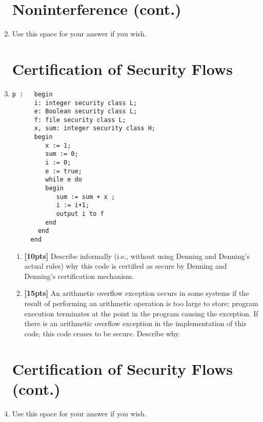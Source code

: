 \documentclass[12pt]{article}
\begin{document}
\begin{enumerate}
\newpage
\section*{Noninterference (cont.)}
\item[] Use this space for your answer if you wish.

\newpage
\section{Certification of Security Flows}
\item[]
\begin{verbatim}
p :   begin
      i: integer security class L; 
      e: Boolean security class L;
      f: file security class L;
      x, sum: integer security class H;
      begin
         x := 1;
         sum := 0; 
         i := 0;
         e := true; 
         while e do
         begin
            sum := sum + x ; 
            i := i+1;
            output i to f
         end 
       end
     end
\end{verbatim}
\begin{enumerate}
\item {\bf [10pts]} Describe informally (i.e., without using Denning and Denning's actual rules) why this code is certified as secure by Denning and Denning's certification mechanism. 
\item {\bf [15pts]} An arithmetic overflow exception occurs in some systems if the result of performing an arithmetic operation is too large to store; program execution terminates at the point in the program causing the exception. If there is an arithmetic overflow exception in the implementation of this code, this code ceases to be secure. Describe why.
\end{enumerate}
\newpage
\section*{Certification of Security Flows (cont.)}
\item[] Use this space for your answer if you wish.
\end{enumerate}
\end{document}
